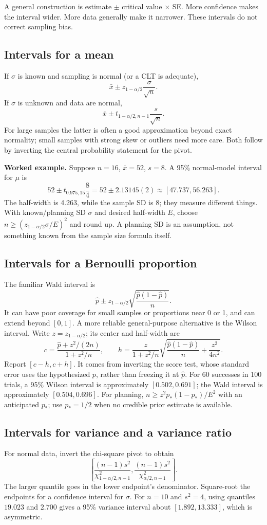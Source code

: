 A general construction is estimate $\pm$ critical value $\times$ SE.
More confidence makes the interval wider. More data generally make it
narrower. These intervals do not correct sampling bias.

\subsection{Intervals for a mean}
If $\sigma$ is known and sampling is normal (or a CLT is adequate),
\[
\bar x\pm z_{1-\alpha/2}\frac{\sigma}{\sqrt n}.
\]
If $\sigma$ is unknown and data are normal,
\[
\bar x\pm t_{1-\alpha/2,n-1}\frac{s}{\sqrt n}.
\]
For large samples the latter is often a good approximation beyond exact
normality; small samples with strong skew or outliers need more care.
Both follow by inverting the central probability statement for the pivot.

\textbf{Worked example.} Suppose $n=16$, $\bar x=52$, $s=8$. A 95\% normal-model
interval for $\mu$ is
\[
52\pm t_{0.975,15}\frac8{4}=52\pm2.13145(2)
\approx[47.737,56.263].
\]
The half-width is 4.263, while the sample SD is 8; they measure different
things. With known/planning SD $\sigma$ and desired half-width $E$, choose
$n\geq(z_{1-\alpha/2}\sigma/E)^2$ and round up. A planning SD is an assumption,
not something known from the sample size formula itself.

\subsection{Intervals for a Bernoulli proportion}
The familiar Wald interval is
\[
\hat p\pm z_{1-\alpha/2}\sqrt{\frac{\hat p(1-\hat p)}n}.
\]
It can have poor coverage for small samples or proportions near 0 or 1,
and can extend beyond $[0,1]$. A more reliable general-purpose alternative
is the Wilson interval. Write $z=z_{1-\alpha/2}$; its center and half-width are
\[
c=\frac{\hat p+z^2/(2n)}{1+z^2/n},\qquad
h=\frac{z}{1+z^2/n}
\sqrt{\frac{\hat p(1-\hat p)}n+\frac{z^2}{4n^2}}.
\]
Report $[c-h,c+h]$. It comes from inverting the score test, whose standard
error uses the hypothesized $p$, rather than freezing it at $\hat p$.
For 60 successes in 100 trials, a 95\% Wilson interval is approximately
$[0.502,0.691]$; the Wald interval is approximately $[0.504,0.696]$.
For planning, $n\geq z^2p_*(1-p_*)/E^2$ with an anticipated $p_*$;
use $p_*=1/2$ when no credible prior estimate is available.

\subsection{Intervals for variance and a variance ratio}
For normal data, invert the chi-square pivot to obtain
\[
\left[\frac{(n-1)s^2}{\chi^2_{1-\alpha/2,n-1}},
\frac{(n-1)s^2}{\chi^2_{\alpha/2,n-1}}\right].
\]
The larger quantile goes in the lower endpoint's denominator. Square-root
the endpoints for a confidence interval for $\sigma$.
For $n=10$ and $s^2=4$, using quantiles $19.023$ and $2.700$ gives a 95\%
variance interval about $[1.892,13.333]$, which is asymmetric.

